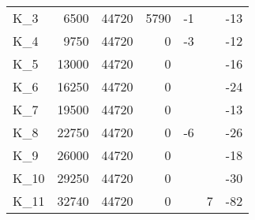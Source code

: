 \begin{tabular}{lrrrllr}
K\_3 & 6500 & 44720 & 5790 & -1 &  & -13 \\
K\_4 & 9750 & 44720 & 0 & -3 &  & -12 \\
K\_5 & 13000 & 44720 & 0 &  &  & -16 \\
K\_6 & 16250 & 44720 & 0 &  &  & -24 \\
K\_7 & 19500 & 44720 & 0 &  &  & -13 \\
K\_8 & 22750 & 44720 & 0 & -6 &  & -26 \\
K\_9 & 26000 & 44720 & 0 &  &  & -18 \\
K\_10 & 29250 & 44720 & 0 &  &  & -30 \\
K\_11 & 32740 & 44720 & 0 &  & 7 & -82 \\
\bottomrule
\end{tabular}
